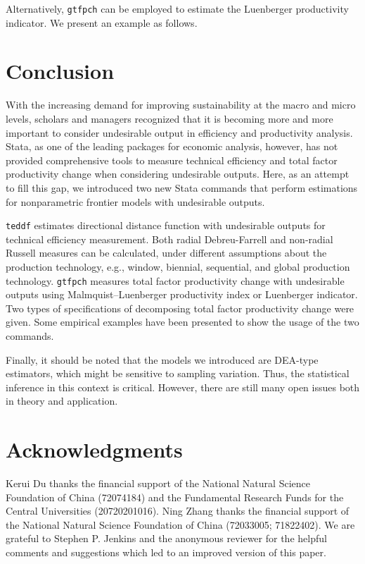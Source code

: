 \begin{stlog}
	
\end{stlog}

Alternatively, {\tt gtfpch} can be employed to estimate the Luenberger productivity indicator. We present an example as follows.  

\begin{stlog}
	
\end{stlog}



\section{Conclusion}\label{sec_conclusion}
With the increasing demand for improving sustainability at the macro and micro levels, scholars and managers recognized that it is becoming more and more important to consider undesirable output in efficiency and productivity analysis. 
Stata, as one of the leading packages for economic analysis, however, has not provided comprehensive tools to measure technical efficiency and total factor productivity change when considering undesirable outputs. 
Here, as an attempt to fill this gap, we introduced two new Stata commands that perform estimations for nonparametric frontier models with undesirable outputs.

{\tt teddf} estimates directional distance function with undesirable outputs for technical efficiency measurement. Both radial Debreu-Farrell and non-radial Russell measures can be calculated, under different assumptions about the production technology, e.g., window, biennial, sequential, and global production technology.
{\tt gtfpch} measures total factor productivity change with undesirable outputs using Malmquist–Luenberger productivity index or Luenberger indicator. Two types of specifications of decomposing total factor productivity change were given. 
Some empirical examples have been presented to show the usage of the two commands.

Finally, it should be noted that the models we introduced are DEA-type estimators, which might be sensitive to sampling variation. Thus, the statistical inference in this context is critical. However, there are still many open issues both in theory and application.



\section{Acknowledgments}
Kerui Du thanks the financial support of the National Natural Science Foundation of China (72074184) and the Fundamental Research Funds for the Central Universities (20720201016). Ning Zhang thanks the financial support of the National Natural Science Foundation of China (72033005; 71822402). We are grateful to Stephen P. Jenkins and the anonymous reviewer for the helpful comments and suggestions which led to an improved version of this paper.


\endinput

